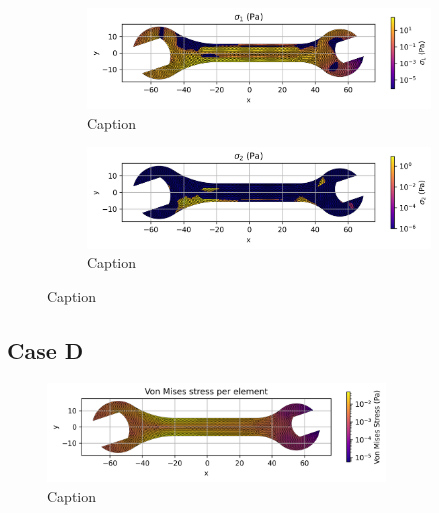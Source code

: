     \begin{figure}[H]
        \centering
        \begin{subfigure}[t]{0.49\textwidth}
        \centering
        \includegraphics[width=\textwidth]{GRAFICOS/Case c - sigma_1_per_element.png}
        \caption{Caption}
        \label{fig:deformada_reacciones}
        \end{subfigure}
        \hfill
        \begin{subfigure}[t]{0.49\textwidth}
        \centering
        \includegraphics[width=\textwidth]{GRAFICOS/Case c - sigma_2_per_element.png}
        \caption{Caption}
        \label{fig:von_mises}
        \end{subfigure}
        \caption{Caption}
        \label{fig:analisis_estructural}
    \end{figure}

\subsection{Case D}

\begin{figure}[H]
    \centering
    \includegraphics[width=0.8\textwidth]{GRAFICOS/Case d_von_mises_per_element.png}
    \caption{Caption}
    \label{fig:strain}
  \end{figure}

